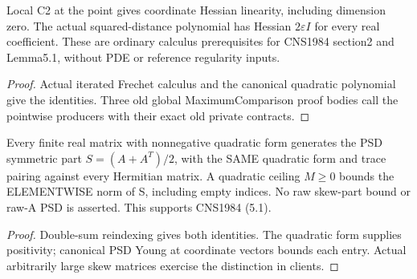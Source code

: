 \begin{lemma}
  \label{lem:pointwise-hessian-linearity}
  \leanok
  Local C2 at the point gives coordinate Hessian linearity, including dimension
  zero. The actual squared-distance polynomial has Hessian $2\varepsilon I$
  for every real coefficient. These are ordinary calculus prerequisites for
  CNS1984 section2 and Lemma5.1, without PDE or reference regularity inputs.
\end{lemma}
\begin{proof}
  \leanok
  Actual iterated Frechet calculus and the canonical quadratic polynomial
  give the identities. Three old global MaximumComparison proof bodies call
  the pointwise producers with their exact old private contracts.
\end{proof}

\begin{lemma}
  \label{lem:symmetric-quadratic-coefficient}
  \leanok
  Every finite real matrix with nonnegative quadratic form generates the PSD
  symmetric part $S=(A+A^T)/2$, with the SAME quadratic form and trace pairing
  against every Hermitian matrix. A quadratic ceiling $M\ge0$ bounds the
  ELEMENTWISE norm of S, including empty indices. No raw skew-part bound or
  raw-A PSD is asserted. This supports CNS1984 (5.1).
\end{lemma}
\begin{proof}
  \leanok
  Double-sum reindexing gives both identities. The quadratic form supplies
  positivity; canonical PSD Young at coordinate vectors bounds each entry.
  Actual arbitrarily large skew matrices exercise the distinction in clients.
\end{proof}

